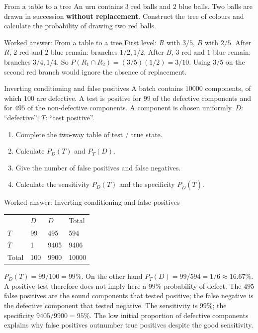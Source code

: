 \documentclass[aspectratio=169,10pt]{beamer}
\begin{document}
\begin{frame}{From a table to a tree}
An urn contains \(3\) red balls and \(2\) blue balls. Two balls are drawn in succession \textbf{without replacement}. Construct the tree of colours and calculate the probability of drawing two red balls.
\end{frame}
\begin{frame}{Worked answer: From a table to a tree}
First level: \(R\) with \(3/5\), \(B\) with \(2/5\). After \(R\), \(2\) red and \(2\) blue remain: branches \(1/2,1/2\). After \(B\), \(3\) red and \(1\) blue remain: branches \(3/4,1/4\). So \(P(R_1\cap R_2)=(3/5)(1/2)=3/10\). Using \(3/5\) on the second red branch would ignore the absence of replacement.
\end{frame}
\begin{frame}{Inverting conditioning and false positives}
A batch contains \(10000\) components, of which \(100\) are defective. A test is positive for \(99\) of the defective components and for \(495\) of the non-defective components. A component is chosen uniformly. \(D\): “defective”; \(T\): “test positive”.

\begin{enumerate}
\setcounter{enumi}{0}\item Complete the two-way table of test / true state.
\item Calculate \(P_D(T)\) and \(P_T(D)\).
\item Give the number of false positives and false negatives.
\item Calculate the sensitivity \(P_D(T)\) and the specificity \(P_{\overline D}(\overline T)\).

\end{enumerate}
\end{frame}
\begin{frame}{Worked answer: Inverting conditioning and false positives}
\begin{center}\begin{tabular}{llll}
 & \(D\) & \(\overline D\) & Total \\ 
\(T\) & 99 & 495 & 594 \\ 
\(\overline T\) & 1 & 9405 & 9406 \\ 
Total & 100 & 9900 & 10000 \\ 
\end{tabular}\end{center} 
\(P_D(T)=99/100=99\%\). On the other hand \(P_T(D)=99/594=1/6\approx16.67\%\). A positive test therefore does not imply here a \(99\%\) probability of defect.
The \(495\) false positives are the sound components that tested positive; the false negative is the defective component that tested negative. The sensitivity is \(99\%\); the specificity \(9405/9900=95\%\).
The low initial proportion of defective components explains why false positives outnumber true positives despite the good sensitivity.
\end{frame}
\end{document}
